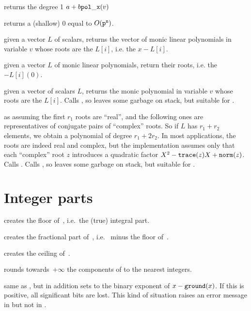  returns the degree 1
 $a + b {\tt pol\_x}(v)$

 returns a (shallow) $0$
 equal to $O({\tt p}^{\tt n})$.


 given a vector $L$ of scalars,
returns the vector of monic linear polynomials in variable $v$ whose roots
are the $L[i]$, i.e. the $x - L[i]$.

 given a vector $L$ of monic linear
polynomials, return their roots, i.e. the $- L[i](0)$.

 given a vector of scalars $L$,
returns the monic polynomial in variable $v$ whose roots are the $L[i]$.
Calls , so leaves some garbage on stack, but
suitable for .

 as 
assuming the first $r_1$ roots are ``real'', and the following ones are
representatives of conjugate pairs of ``complex'' roots. So if $L$ has $r_1 +
r_2$ elements, we obtain a polynomial of degree $r_1 + 2r_2$. In most
applications, the roots are indeed real and complex, but the implementation
assumes only that each ``complex'' root $z$ introduces a quadratic
factor $X^2 - {\tt trace}(z) X + {\tt norm}(z)$. Calls
.
Calls , so leaves some garbage on stack, but
suitable for .

\section{Integer parts}

 creates the floor of~, i.e.\ the (true)
integral part.

 creates the fractional part of~, i.e.\ 
minus the floor of~.

 creates the ceiling of~.

 rounds towards~$+\infty$ the components of 
to the nearest integers.

 same as , but in addition sets
 to the binary exponent of $x - {\tt ground}(x)$. If this is
positive, all significant bits are lost. This kind of situation raises an
error message in  but not in .

